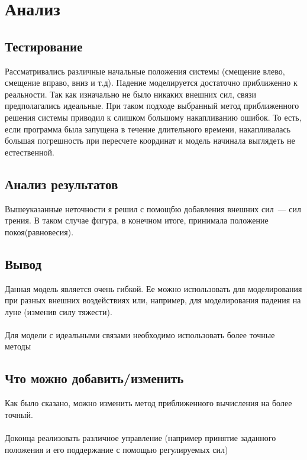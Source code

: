 \section{Анализ}
\subsection{Тестирование}
Рассматривались различные начальные положения системы (смещение влево, смещение вправо, вниз и т.д). Падение моделируется достаточно приближенно к реальности. Так как изначально не было никаких внешних сил, связи предполагались идеальные. При таком подходе выбранный метод приближенного решения системы приводил к слишком большому накапливанию ошибок. То есть, если программа была запущена в течение длительного времени, накапливалась большая погрешность при пересчете координат и модель начинала выглядеть не естественной. 
\subsection{Анализ результатов}
Вышеуказанные неточности я решил с помощбю добавления внешних сил~--- сил трения. В таком случае фигура, в конечном итоге, принимала положение покоя(равновесия).
\subsection{Вывод}
Данная модель является очень гибкой. Ее можно использовать для моделирования при разных внешних воздействиях или, например, для моделирования падения на луне (изменив силу тяжести).
\\\\
Для модели с идеальными связами необходимо использовать более точные методы
\subsection{Что можно добавить/изменить}
Как было сказано, можно изменить метод приближенного вычисления на более точный.
\\\\
Доконца реализовать различное управление (например принятие заданного положения и его поддержание с помощью регулируемых сил)